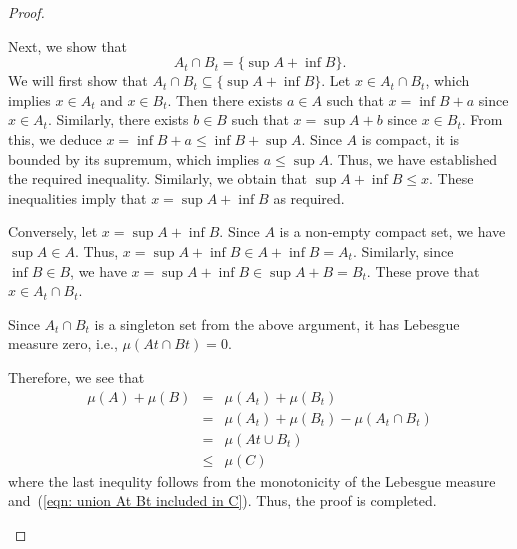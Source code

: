 \begin{proof}
\begin{enumerate}
\begin{enumerate}
            Next, we show that 
            \begin{equation*}
                A_t \cap B_t = \{\sup A + \inf B\}.
            \end{equation*}
            We will first show that \(A_t \cap B_t \subseteq \{\sup A + \inf B\}\). 
            Let \(x \in A_t \cap B_t\), which implies \(x \in A_t\) and \(x \in B_t\).
            Then there exists \(a \in A\) such that \(x = \inf B + a\) since \(x \in A_t\). 
            Similarly, there exists \(b \in B\) such that \(x = \sup A + b\) since \(x \in B_t\).
            From this, we deduce \(x = \inf B + a \leq \inf B + \sup A\). 
            Since \(A\) is compact, it is bounded by its supremum, which implies \(a \leq \sup A\).
            Thus, we have established the required inequality. 
            Similarly, we obtain that \(\sup A + \inf B \leq x\). 
            These inequalities imply that \(x = \sup A + \inf B\) as required.

            Conversely, let \(x = \sup A + \inf B\).
            Since \(A\) is a non-empty compact set, we have \(\sup A \in A\).
            Thus, \(x = \sup A + \inf B \in A + \inf B = A_t\).
            Similarly, since \(\inf B \in B\), we have \(x = \sup A + \inf B \in \sup A + B = B_t\).
            These prove that \(x \in A_t \cap B_t\).

            Since \(A_t \cap B_t\) is a singleton set from the above argument, it has Lebesgue measure zero, 
            i.e., \(\mu (At \cap Bt) = 0\).

            Therefore, we see that 
            \begin{eqnarray*}
                \mu(A) + \mu(B) & = & \mu(A_t) + \mu(B_t)\\
                & = & \mu(A_t) + \mu(B_t) - \mu(A_t \cap B_t)\\
                & = & \mu(At \cup B_t)\\
                & \leq & \mu (C)
            \end{eqnarray*}
            where the last inequlity follows from the monotonicity of the Lebesgue measure and~(\ref{eqn: union At Bt included in C}).
            Thus, the proof is completed.
        \end{enumerate}
    \end{enumerate}
\end{proof}